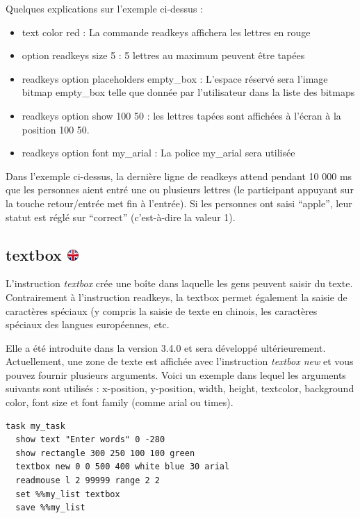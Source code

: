 \documentclass[
]{book}
\providecommand{\tightlist}{%
  \setlength{\itemsep}{0pt}\setlength{\parskip}{0pt}}
\begin{document}
Quelques explications sur l'exemple ci-dessus :

\begin{itemize}
\tightlist
\item
  text color red : La commande readkeys affichera les lettres en rouge
\item
  option readkeys size 5 : 5 lettres au maximum peuvent être tapées
\item
  readkeys option placeholders empty\_box : L'espace réservé sera l'image bitmap empty\_box telle que donnée par l'utilisateur dans la liste des bitmaps
\item
  readkeys option show 100 50 : les lettres tapées sont affichées à l'écran à la position 100 50.
\item
  readkeys option font my\_arial : La police my\_arial sera utilisée
\end{itemize}

Dans l'exemple ci-dessus, la dernière ligne de readkeys attend pendant 10 000 ms que les personnes aient entré une ou plusieurs lettres (le participant appuyant sur la touche retour/entrée met fin à l'entrée). Si les personnes ont saisi ``apple'', leur statut est réglé sur ``correct'' (c'est-à-dire la valeur 1).

\hypertarget{textbox}{%
\subsection[textbox ]{\texorpdfstring{textbox \href{https://www.psytoolkit.org/doc3.4.0/syntax.html\#task-textbox}{\protect\includegraphics{img/ukflag.png}}}{textbox }}\label{textbox}}

L'instruction \emph{textbox} crée une boîte dans laquelle les gens peuvent saisir du texte. Contrairement à l'instruction readkeys, la textbox permet également la saisie de caractères spéciaux (y compris la saisie de texte en chinois, les caractères spéciaux des langues européennes, etc.

Elle a été introduite dans la version 3.4.0 et sera développé ultérieurement. Actuellement, une zone de texte est affichée avec l'instruction \emph{textbox new} et vous pouvez fournir plusieurs arguments. Voici un exemple dans lequel les arguments suivants sont utilisés : x-position, y-position, width, height, textcolor, background color, font size et font family (comme arial ou times).

\begin{verbatim}
task my_task
  show text "Enter words" 0 -280
  show rectangle 300 250 100 100 green
  textbox new 0 0 500 400 white blue 30 arial
  readmouse l 2 99999 range 2 2
  set %%my_list textbox
  save %%my_list
\end{verbatim}
\end{document}
